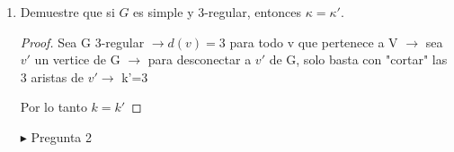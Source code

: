 \documentclass{article}
\begin{document}
\begin{enumerate}
\begin{proof}
   Hipótesis de inducción: supongamos para $\mathcal{T} = k$
   
   Supongamos que si $\mathcal{T} = k$ tal que existen i,j tal que $i \neq j$ e i,j pertenezen a $\left\lbrace 1,...,k \right\rbrace$ donde $T_i \cap T_j \neq \emptyset \rightarrow  \bigcap\limit_{r=1}^{k}{T_r} \neq \emptyset$
   
   Paso inductivo: Pd para $\mathcal{T} = k+1$
   
   Pd si existen i,j tal que $i \neq j$ e i,j pertenezen a $\left\lbrace 1,...,k+1 \right\rbrace$ donde $T_i \cap T_j \neq \emptyset \rightarrow  \bigcap\limit_{r=1}^{k+1}{T_r} \neq \emptyset$
   
   Dem (Reducción al absurdo)
   
   Supongamos $\bigcap\limit_{r=1}^{k+1}{T_r} = \emptyset$ y existen i,j pertenezen a $\left\lbrace 1,...,k+1 \right\rbrace$ donde $T_i \cap T_j \neq \emptyset \rightarrow $ consideremos a T' como el subárbol formado por la unión de todos los subárboles de $T_1, T_2,...;T_{k+1}$ menos los subárboles $T_i$ y $T_j$. Es decir T'= $\bigcup\limit_{r=1, r \neq i,  r \neq j }^{k+1}{T_r} \rightarrow T' \cap T_i \cap T_j = \emptyset$, pero por paso base esto es una contradicción $\rightarrow$ existe un x tal que x pertenece a  $\bigcap\limit_{r=1}^{k+1}{T_r}$ 
   
   Por lo tanto la porposición es verdadera.
  \end{proof}
  

  Ejercicios de la tarea 5 
  

  
  $\blacktriangleright$ Pregunta 1 
  
  \item Demuestre que si $G$ es simple y $3$-regular, entonces $\kappa = \kappa'$.
  
  \begin{proof} 
  
  Sea G 3-regular $\rightarrow d(v)=3$ para todo v que pertenece a V $\rightarrow$ sea $v'$ un vertice de G  $\rightarrow$ para desconectar a $v'$ de G, solo basta  con "cortar" las 3 aristas de $v' \rightarrow$ k'=3
  
  Por lo tanto $k=k'$
  \end{proof}
  


  $\blacktriangleright$ Pregunta 2
  

\end{enumerate}
\end{document}
